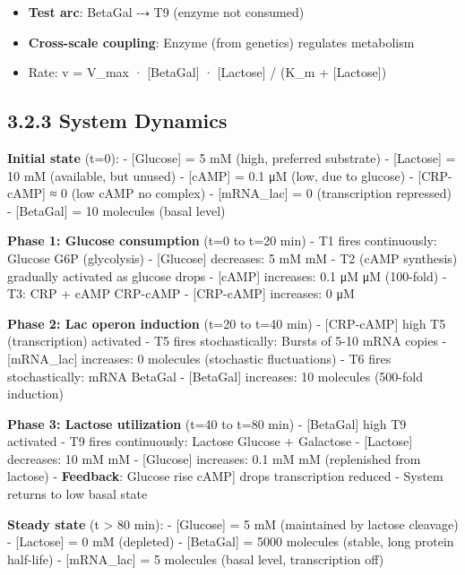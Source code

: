 \begin{itemize}
\tightlist
\item
  \textbf{Test arc}: BetaGal ⤏ T9 (enzyme not consumed)
\item
  \textbf{Cross-scale coupling}: Enzyme (from genetics) regulates
  metabolism
\item
  Rate: v = V\_max · {[}BetaGal{]} · {[}Lactose{]} / (K\_m +
  {[}Lactose{]})
\end{itemize}

\hypertarget{system-dynamics}{%
\subsection{3.2.3 System Dynamics}\label{system-dynamics}}

\textbf{Initial state} (t=0): - {[}Glucose{]} = 5 mM (high, preferred
substrate) - {[}Lactose{]} = 10 mM (available, but unused) - {[}cAMP{]}
= 0.1 μM (low, due to glucose) - {[}CRP-cAMP{]} ≈ 0 (low cAMP \textrightarrow no
complex) - {[}mRNA\_lac{]} = 0 (transcription repressed) - {[}BetaGal{]}
= 10 molecules (basal level)

\textbf{Phase 1: Glucose consumption} (t=0 to t=20 min) - T1 fires
continuously: Glucose \textrightarrow G6P (glycolysis) - {[}Glucose{]} decreases: 5 mM
 mM - T2 (cAMP synthesis) gradually activated as glucose drops -
{[}cAMP{]} increases: 0.1 μM  μM (100-fold) - T3: CRP + cAMP \textrightarrow
CRP-cAMP - {[}CRP-cAMP{]} increases: 0  μM

\textbf{Phase 2: Lac operon induction} (t=20 to t=40 min) -
{[}CRP-cAMP{]} high \textrightarrow T5 (transcription) activated - T5 fires
stochastically: Bursts of 5-10 mRNA copies - {[}mRNA\_lac{]} increases:
0  molecules (stochastic fluctuations) - T6 fires stochastically:
mRNA \textrightarrow BetaGal - {[}BetaGal{]} increases: 10  molecules (500-fold
induction)

\textbf{Phase 3: Lactose utilization} (t=40 to t=80 min) - {[}BetaGal{]}
high \textrightarrow T9 activated - T9 fires continuously: Lactose \textrightarrow Glucose +
Galactose - {[}Lactose{]} decreases: 10 mM  mM - {[}Glucose{]}
increases: 0.1 mM  mM (replenished from lactose) - \textbf{Feedback}:
Glucose rise \textrightarrow {[}cAMP{]} drops \textrightarrow transcription reduced - System returns
to low basal state

\textbf{Steady state} (t \textgreater{} 80 min): - {[}Glucose{]} = 5 mM
(maintained by lactose cleavage) - {[}Lactose{]} = 0 mM (depleted) -
{[}BetaGal{]} = 5000 molecules (stable, long protein half-life) -
{[}mRNA\_lac{]} = 5 molecules (basal level, transcription off)

